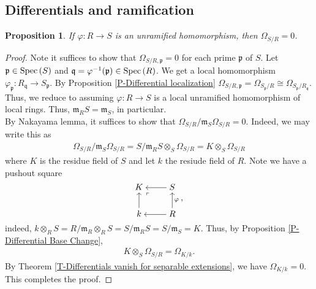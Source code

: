 \documentclass[letterpaper,10pt,twoside]{amsart}
\newcommand{\spec}[1]{{\fontfamily{lmss}\selectfont 
		\text{\rm Spec}\left(#1\right )
}}
\newcommand{\isom}{\cong}
\newcommand{\ideal}[1]{\mathfrak{#1}}
\newcommand{\tens}{\otimes}
\theoremstyle{proposition}
\newtheorem{proposition}{Proposition}[section]
\theoremstyle{definition}
\theoremstyle{theorem}
\theoremstyle{definition}
\theoremstyle{definition}
\theoremstyle{definition}
\theoremstyle{lemma}
\theoremstyle{definition}
\theoremstyle{definition}
\theoremstyle{corollary}
\theoremstyle{definition}
\begin{document}
	\subsection{Differentials and ramification}
	\begin{proposition}\label{P-Unramified implies no differentials}
		If $\varphi : R\to S$ is an unramified homomorphism, then $\Omega_{S/R} = 0$.
	\end{proposition}
	\begin{proof}
		Note it suffices to show that $\Omega_{S/R,\ideal{p}} = 0$ for each prime $\ideal{p}$ of $S$. Let $\ideal{p}\in \spec{S}$ and $\ideal{q} = \varphi^{-1}(\ideal{p}) \in \spec{R}$. We get a local homomorphism $\varphi_{\ideal{p}} : R_\ideal{q} \to S_{\ideal{p}}$. By Proposition \ref{P-Differential localization} $ \Omega_{S/R,\ideal{p}} = \Omega_{S_{\ideal{p}}/R} \isom \Omega_{S_{\ideal{p}}/ R_\ideal{q}}$. Thus, we reduce to assuming $\varphi :R\to S$ is a local unramified homomorphism of local rings. Thus, $\ideal{m}_{R}S = \ideal{m}_{S}$, in particular.\\\indent
		By Nakayama lemma, it suffices to show that $\Omega_{S/R}/\ideal{m}_{S}\Omega_{S/R} = 0$. Indeed, we may write this as
		\begin{align*}
			\Omega_{S/R}/\ideal{m}_{S}\Omega_{S/R} = S/\ideal{m}_{R}S \tens_{S} \Omega_{S/R} = K\tens_{S}\Omega_{S/R} 
		\end{align*}
		where $K$ is the residue field of $S$ and let $k$ the resiude field of $R$. Note we have a pushout square 
		\[\begin{tikzcd}[cramped]
			K & S \\
			k & R
			\arrow["\ulcorner"{anchor=center, pos=0.125}, draw=none, from=1-1, to=2-2]
			\arrow[from=1-2, to=1-1]
			\arrow[from=2-1, to=1-1]
			\arrow["\varphi"', from=2-2, to=1-2]
			\arrow[from=2-2, to=2-1]
		\end{tikzcd},\]
		indeed, $k \tens_{R} S = R/\ideal{m}_{R}\tens_{R} S = S/\ideal{m}_{R}S = S/\ideal{m}_{S} = K$. Thus, by Proposition \ref{P-Differential Base Change}, 
		\begin{align*}
			K\tens_{S}\Omega_{S/R} = \Omega_{K/k}.
		\end{align*} 
		By Theorem \ref{T-Differentials vanish for separable extensions}, we have $\Omega_{K/k} = 0$. This completes the proof.
	\end{proof}
\end{document}
